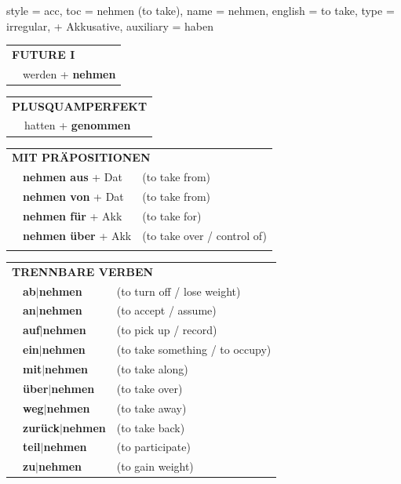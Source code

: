 \begin{verbentry}{
  style = {acc},
  toc = {nehmen (to take)},
  name = {nehmen},
  english = {to take},
  type = {irregular, + Akkusative},
  auxiliary = {haben}
}
\begin{tabular}{rl}
    \multicolumn{2}{l}{\textbf{FUTURE I} }\\
  &  werden + \textbf{nehmen}\\
 
  \end{tabular}
\hfill
   \begin{tabular}{rl}
      \multicolumn{2}{l}{\textbf{PLUSQUAMPERFEKT}}\\
  &  hatten + \textbf{genommen}\\
  \end{tabular}

    \vspace{10pt}

   \begin{tabular}{lll}
      \multicolumn{3}{l}{\textbf{MIT PRÄPOSITIONEN}}\\
& \textbf{nehmen aus} + Dat & (to take from)\\
& \textbf{nehmen von} + Dat & (to take from)\\
&\textbf{nehmen für} + Akk & (to take for)\\
&\textbf{nehmen über} + Akk & (to take over / control of)\\
\vspace{50pt}
  \end{tabular}
  \hfill
   \begin{tabular}{lll}
      \multicolumn{3}{l}{\textbf{TRENNBARE VERBEN}}\\
      & \textbf{ab$|$nehmen} & (to turn off / lose weight)\\
 & \textbf{an$|$nehmen} & (to accept / assume)\\
 & \textbf{auf$|$nehmen} & (to pick up / record)\\
 & \textbf{ein$|$nehmen} & (to take something / to occupy)\\
  & \textbf{mit$|$nehmen} & (to take along)\\
  & \textbf{über$|$nehmen} & (to take over)\\
  & \textbf{weg$|$nehmen} & (to take away)\\
     & \textbf{zurück$|$nehmen} & (to take back)\\
     & \textbf{teil$|$nehmen} & (to participate)\\
       & \textbf{zu$|$nehmen} & (to gain weight)\\
  \end{tabular}



  \vspace{-5pt}
\end{verbentry}

